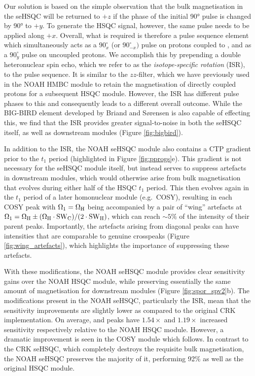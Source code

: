 \documentclass[draft,11pt]{article}
\newcommand*{\carbon}{\ce{^{13}C}}
\newcommand*{\proton}{\ce{^{1}H}}
\newcommand*{\figref}[1]{Figure \ref{fig:#1}}
\begin{document}
Our solution is based on the simple observation that the bulk magnetisation in the seHSQC will be returned to $+z$ if the phase of the initial \proton{} \ang{90} pulse is changed by \ang{90} to $+y$.
To generate the HSQC signal, however, the same pulse needs to be applied along $+x$.
Overall, what is required is therefore a pulse sequence element which simultaneously acts as a $90^\circ_x$ (or $90^\circ_{-x})$ pulse on protons coupled to \carbon{}, and as a $90^\circ_y$ pulse on uncoupled protons.
We accomplish this by prepending a double heteronuclear spin echo, which we refer to as the \textit{isotope-specific rotation} (ISR), to the pulse sequence.
It is similar to the $zz$-filter, which we have previously used in the NOAH HMBC module to retain the magnetisation of directly coupled protons for a subsequent HSQC module.\autocite{Kupce2018CC, Kupce2019JMR}
However, the ISR has different pulse phases to this and consequently leads to a different overall outcome.
While the BIG-BIRD element developed by Briand and S{\o}rensen\autocite{Briand1997JMR} is also capable of effecting this, we find that the ISR provides greater signal-to-noise in both the seHSQC itself, as well as downstream modules (\figref{bigbird}).

In addition to the ISR, the NOAH seHSQC module also contains a CTP gradient prior to the $t_1$ period (highlighted in \figref{pprogs}e).
This gradient is not necessary for the seHSQC module itself, but instead serves to suppress artefacts in downstream modules, which would otherwise arise from bulk magnetisation that evolves during either half of the HSQC $t_1$ period.
This then evolves again in the $t_1$ period of a later homonuclear module (e.g.\ COSY), resulting in each COSY peak with $\Omega_1 = \Omega_{\ce{H}}$ being accompanied by a pair of ``wing'' artefacts at $\Omega_1 = \Omega_{\ce{H}} \pm (\Omega_{\ce{H}}\cdot\mathrm{SW}_{\ce{C}})/(2\cdot \mathrm{SW}_{\ce{H}})$, which can reach $\sim 5\%$ of the intensity of their parent peaks.
Importantly, the artefacts arising from diagonal peaks can have intensities that are comparable to genuine crosspeaks (\figref{wing_artefacts}), which highlights the importance of suppressing these artefacts.

With these modifications, the NOAH seHSQC module provides clear sensitivity gains over the NOAH HSQC module, while preserving essentially the same amount of \proton{} magnetisation for downstream modules (\figref{spor_spv2}b).
The modifications present in the NOAH seHSQC, particularly the ISR, mean that the sensitivity improvements are slightly lower as compared to the original CRK implementation.
On average,  and  peaks have $1.54\times$ and $1.19\times$ increased sensitivity respectively relative to the NOAH HSQC module.
However, a dramatic improvement is seen in the COSY module which follows.
In contrast to the CRK seHSQC, which completely destroys the requisite bulk magnetisation, the NOAH seHSQC preserves the majority of it, performing 92\% as well as the original HSQC module.
\end{document}

